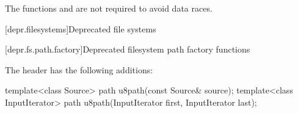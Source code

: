 \pnum
The functions  and 
are not required to avoid data races.


[depr.filesystems]{Deprecated file systems}

[depr.fs.path.factory]{Deprecated filesystem path factory functions}

\pnum
The header  has the following additions:

%
\begin{itemdecl}
template<class Source>
  path u8path(const Source& source);
template<class InputIterator>
  path u8path(InputIterator first, InputIterator last);
\end{itemdecl}


